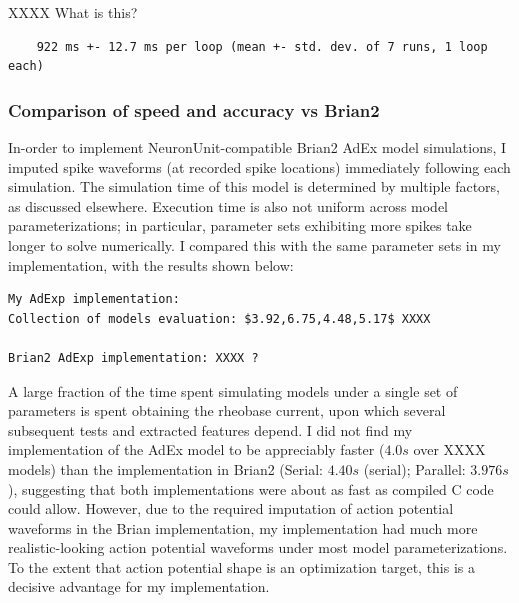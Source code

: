 


XXXX What is this?
\begin{verbatim}
    922 ms +- 12.7 ms per loop (mean +- std. dev. of 7 runs, 1 loop each)
\end{verbatim}

\subsubsection{Comparison of speed and accuracy vs Brian2}
In-order to implement NeuronUnit-compatible Brian2 AdEx model simulations, I imputed spike waveforms (at recorded spike locations) immediately following each simulation.
The simulation time of this model is determined by multiple factors, as discussed elsewhere. Execution time is also not uniform across model parameterizations; in particular, parameter sets exhibiting more spikes take longer to solve numerically.
I compared this with the same parameter sets in my implementation, with the results shown below:

\begin{verbatim}
My AdExp implementation:
Collection of models evaluation: $3.92,6.75,4.48,5.17$ XXXX

Brian2 AdExp implementation: XXXX ?
\end{verbatim}

A large fraction of the time spent simulating models under a single set of parameters is spent obtaining the rheobase current, upon which several subsequent tests and extracted features depend.
I did not find my implementation of the AdEx model to be appreciably faster ($4.0s$ over XXXX models) than the implementation in Brian2 (Serial: $4.40s$ (serial); Parallel: $3.976s$), suggesting that both implementations were about as fast as compiled C code could allow.
However, due to the required imputation of action potential waveforms in the Brian implementation, my implementation had much more realistic-looking action potential waveforms under most model parameterizations.
To the extent that action potential shape is an optimization target, this is a decisive advantage for my implementation.

